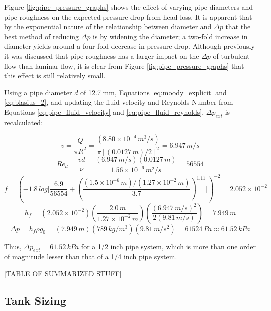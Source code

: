 \documentclass[9pt]{article} %
\numberwithin{equation}{section} %
\begin{document}
Figure \ref{fig:pipe_pressure_graphs} shows the effect of varying pipe diameters and pipe roughness on the expected pressure drop from head loss. It is apparent that by the exponential nature of the relationship between diameter and $\Delta p$ that the best method of reducing $\Delta p$ is by widening the diameter; a two-fold increase in diameter yields around a four-fold decrease in pressure drop. Although previously it was discussed that pipe roughness has a larger impact on the $\Delta p$ of turbulent flow than laminar flow, it is clear from Figure \ref{fig:pipe_pressure_graphs} that this effect is still relatively small.

Using a pipe diameter $d$ of 12.7 mm, Equations \ref{eq:moody_explicit} and \ref{eq:blasius_2}, and updating the fluid velocity and Reynolds Number from Equations \ref{eq:pipe_fluid_velocity} and \ref{eq:pipe_fluid_reynolds}, $\Delta p_{ext}$ is recalculated:

\begin{equation*}
v = \frac{Q}{\pi R^{2}} = \frac{(8.80 \times 10^{-4}\, m^{3}/s)}{\pi [(0.0127\, m) / 2]^{2}} = 6.947\, m/s
\end{equation*}
\begin{equation*}
Re_{d} = \frac{v d}{\nu} = \frac{(6.947\, m/s)(0.0127\, m)}{1.56 \times 10^{-6}\, m^{2}/s} = 56554
\end{equation*}
\begin{equation*}
f = \left( -1.8\, log \Bigg[ \frac{6.9}{56554} + \left( \frac{(1.5 \times 10^{-6}\, m)/(1.27 \times 10^{-2}\, m)}{3.7} \right) ^{1.11} \Bigg] \right)^{-2} = 2.052 \times 10^{-2}
\end{equation*}
\begin{equation*}
h_{f} = (2.052 \times 10^{-2}) \left( \frac{2.0\, m}{1.27 \times 10^{-2}\, m} \right) \left( \frac{(6.947\, m/s)^{2}}{2 (9.81\, m/s)} \right) = 7.949 \, m
\end{equation*}
\begin{equation*}
\Delta p = h_{f} \rho g_{0} = (7.949 \, m)(789 \, kg/m^{3})(9.81 \, m/s^{2}) = 61524 \, Pa \approx 61.52 \, kPa
\end{equation*}

Thus, $\Delta p_{ext} = 61.52 \, kPa$ for a 1/2 inch pipe system, which is more than one order of magnitude lesser than that of a 1/4 inch pipe system.

[TABLE OF SUMMARIZED STUFF]

\subsection{Tank Sizing}
\end{document}
